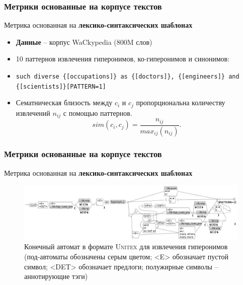 \documentclass{beamer}
\begin{document}
\begin{frame}
\frametitle{Метрики основанные на корпусе текстов }


	
Метрика основанная на \textbf{лексико-синтаксических шаблонах} 
\begin{itemize}
	\item \textbf{Данные} -- корпус WaCkypedia (800M слов) 
	\item 10 паттернов извлечения гиперонимов, ко-гиперонимов и синонимов:
	\item \texttt{such diverse \{[occupations]\} as
  \{[doctors]\}, \{[engineers]\} and \{[scientists]\}[PATTERN=1]}
  
  \item Сематническая близость между $c_i$ и $c_j$ пропорциональна количеству извлечений  $n_{ij}$ с помощью паттернов.
   $$
   sim(c_i,c_j) = \frac{n_{ij}}{max_{ij}(n_{ij})}.
   $$
\end{itemize}
 
 \end{frame}
 
 \begin{frame}
\frametitle{Метрики основанные на корпусе текстов }
	
Метрика основанная на \textbf{лексико-синтаксических шаблонах} 
 
 
 \begin{figure}
                \includegraphics[width=1.0\textwidth]{figures/hypernym_1}
        \caption{Конечный автомат в формате \textsc{Unitex} для извлечения гиперонимов
        (под-автоматы обозначены серым цветом; <E> обозначает пустой символ; <DET> обозначает предлоги; полужирные символы -- аннотирующие тэги)}
        \label{fig:prcomb}
\end{figure}
	
\end{frame}
\end{document}
